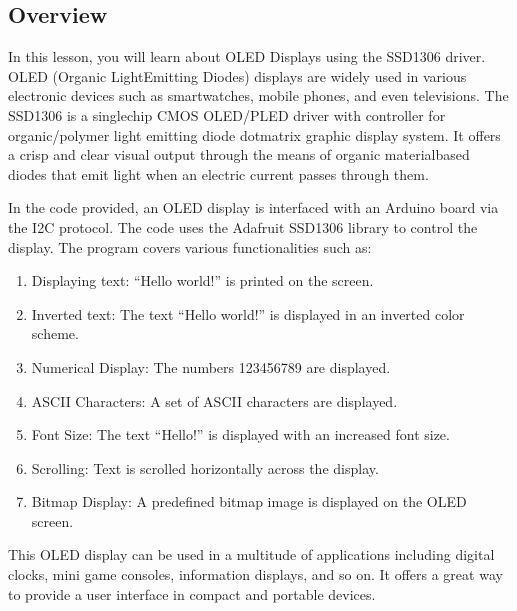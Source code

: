 \documentclass[a4paper,11pt,english]{sphinxmanual}
\begin{document}
\subsection{Overview}
\label{\detokenize{Basic_Project/0.96_inch_OLED:overview}}
\sphinxAtStartPar
In this lesson, you will learn about OLED Displays using the SSD1306 driver. OLED (Organic Light\sphinxhyphen{}Emitting Diodes) displays are widely used in various electronic devices such as smartwatches, mobile phones, and even televisions. The SSD1306 is a single\sphinxhyphen{}chip CMOS OLED/PLED driver with controller for organic/polymer light emitting diode dot\sphinxhyphen{}matrix graphic display system. It offers a crisp and clear visual output through the means of organic material\sphinxhyphen{}based diodes that emit light when an electric current passes through them.

\sphinxAtStartPar
In the code provided, an OLED display is interfaced with an Arduino board via the I2C protocol. The code uses the Adafruit SSD1306 library to control the display. The program covers various functionalities such as:
\begin{enumerate}
%
\item {} 
\sphinxAtStartPar
Displaying text: “Hello world!” is printed on the screen.

\item {} 
\sphinxAtStartPar
Inverted text: The text “Hello world!” is displayed in an inverted color scheme.

\item {} 
\sphinxAtStartPar
Numerical Display: The numbers 123456789 are displayed.

\item {} 
\sphinxAtStartPar
ASCII Characters: A set of ASCII characters are displayed.

\item {} 
\sphinxAtStartPar
Font Size: The text “Hello!” is displayed with an increased font size.

\item {} 
\sphinxAtStartPar
Scrolling: Text is scrolled horizontally across the display.

\item {} 
\sphinxAtStartPar
Bitmap Display: A predefined bitmap image is displayed on the OLED screen.

\end{enumerate}

\sphinxAtStartPar
This OLED display can be used in a multitude of applications including digital clocks, mini game consoles, information displays, and so on. It offers a great way to provide a user interface in compact and portable devices.
\end{document}
